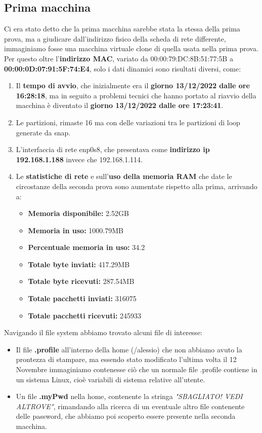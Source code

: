 \documentclass[a4paper]{report}
\begin{document}
\subsection{Prima macchina}
Ci era stato detto che la prima macchina sarebbe stata la stessa della prima prova, ma a giudicare dall'indirizzo fisico della scheda di rete differente, immaginiamo fosse una macchina virtuale clone di quella usata nella prima prova.
\\Per questo oltre l'\textbf{indirizzo MAC}, variato da 00:00:79:DC:8B:51:77:5B a \textbf{00:00:0D:07:91:5F:74:E4}, solo i dati dinamici sono risultati diversi, come:
\begin{enumerate}
	\item Il \textbf{tempo di avvio}, che inizialmente era il \textbf{giorno 13/12/2022 dalle ore 16:28:18}, ma in seguito a problemi tecnici che hanno portato al riavvio della macchina è diventato il \textbf{giorno 13/12/2022 dalle ore 17:23:41}.
	\item Le partizioni, rimaste 16 ma con delle variazioni tra le partizioni di loop generate da snap.
	\item L'interfaccia di rete enp0s8, che presentava come \textbf{indirizzo ip 192.168.1.188} invece che 192.168.1.114.
	\item Le \textbf{statistiche di rete} e sull'\textbf{uso della memoria RAM} che date le circostanze della seconda prova sono aumentate rispetto alla prima, arrivando a:
	\begin{itemize}
		\item \textbf{Memoria disponibile:} 2.52GB
		\item \textbf{Memoria in uso:} 1000.79MB
		\item \textbf{Percentuale memoria in uso:} 34.2%
		\item \textbf{Totale byte inviati:} 417.29MB
		\item \textbf{Totale byte ricevuti:} 287.54MB
		\item \textbf{Totale pacchetti inviati:} 316075
		\item \textbf{Totale pacchetti ricevuti:} 245933
	\end{itemize}

\end{enumerate}
Navigando il file system abbiamo trovato alcuni file di interesse:
\begin{itemize}
	\item Il file \textbf{.profile} all'interno della home (/alessio) che non abbiamo avuto la prontezza di stampare, ma essendo stato modificato l'ultima volta il 12 Novembre immaginiamo contenesse ciò che un normale file .profile contiene in un sistema Linux, cioè variabili di sistema relative all'utente.
	\item Un file\textbf{ .myPwd} nella home, contenente la stringa \textit{\textit{"SBAGLIATO! VEDI ALTROVE"}}, rimandando alla ricerca di un eventuale altro file contenente delle password, che abbiamo poi scoperto essere presente nella seconda macchina.
\end{itemize}
\end{document}
